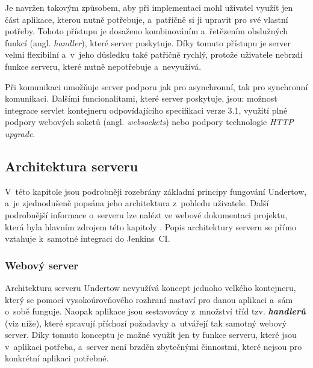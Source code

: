             Je navržen takovým způsobem, aby při implementaci mohl uživatel využít
            jen část aplikace, kterou nutně potřebuje, a~patřičně si ji upravit
            pro své vlastní potřeby.
            Tohoto přístupu je dosaženo kombinováním a~řetězením
            obslužných funkcí (angl. \emph{handler}), které server poskytuje.
            Díky tomuto přístupu je server velmi flexibilní a~v~jeho důsledku
            také patřičně rychlý, protože uživatele nebrzdí funkce
            serveru, které nutně nepotřebuje a~nevyužívá.
            
            Při komunikaci umožňuje server podporu jak pro asynchronní, tak
            pro synchronní komunikaci.
            Dalšími funcionalitami, které server poskytuje, jsou: možnost integrace
            servlet kontejneru odpovídajícího specifikaci verze 3.1,
            využití plné podpory webových soketů (angl. \emph{websockets}) nebo 
            podpory technologie \emph{HTTP upgrade}.

        \subsection{Architektura serveru}
            V~této kapitole jsou podrobněji rozebrány základní principy fungování Undertow, 
            a~je zjednodušeně popsána jeho architektura z~pohledu uživatele. Další podrobnější informace o~serveru 
            lze nalézt ve webové dokumentaci projektu, která byla hlavním zdrojem této kapitoly \cite{undertowDocs}.
            Popis architektury serveru se přímo vztahuje k~samotné integraci do Jenkins~CI.

            \subsubsection{Webový server}
                Architektura serveru Undertow nevyužívá koncept jednoho velkého kontejneru, který se pomocí vysokoúrovňového rozhraní nastaví 
                pro danou aplikaci a~sám o~sobě funguje. Naopak aplikace jsou sestavovány z~množství tříd tzv. \textbf{\emph{handlerů}}
                (viz níže), které spravují příchozí požadavky a~utvářejí tak samotný webový server. 
                Díky tomuto konceptu je možné využít jen ty funkce serveru, které jsou v~aplikaci potřeba, a~server
                není brzděn zbytečnými činnostmi, které nejsou pro konkrétní aplikaci potřebné. 


